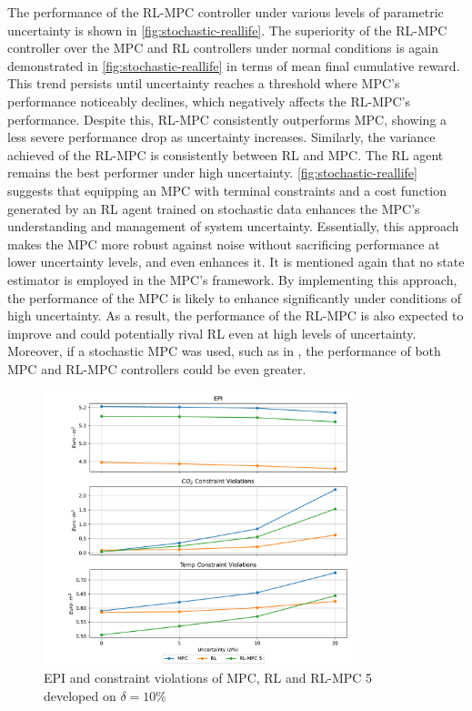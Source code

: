 The performance of the RL-MPC controller under various levels of parametric uncertainty is shown in \autoref{fig:stochastic-reallife}. The superiority of the RL-MPC controller over the MPC and RL controllers under normal conditions is again demonstrated in \autoref{fig:stochastic-reallife} in terms of mean final cumulative reward. This trend persists until uncertainty reaches a threshold where MPC's performance noticeably declines, which negatively affects the RL-MPC's performance. Despite this, RL-MPC consistently outperforms MPC, showing a less severe performance drop as uncertainty increases. Similarly, the variance achieved of the RL-MPC is consistently between RL and MPC. The RL agent remains the best performer under high uncertainty. \autoref{fig:stochastic-reallife} suggests that equipping an MPC with terminal constraints and a cost function generated by an RL agent trained on stochastic data enhances the MPC's understanding and management of system uncertainty. Essentially, this approach makes the MPC more robust against noise without sacrificing performance at lower uncertainty levels, and even enhances it. It is mentioned again that no state estimator is employed in the MPC's framework. By implementing this approach, the performance of the MPC is likely to enhance significantly under conditions of high uncertainty. As a result, the performance of the RL-MPC is also expected to improve and could potentially rival RL even at high levels of uncertainty. Moreover, if a stochastic MPC was used, such as in \citet{boersmaRobustSamplebasedModel2022}, the performance of both MPC and RL-MPC controllers could be even greater.


\begin{figure}[H]
	\centering
	\includegraphics[width=0.8\textwidth]{figures/stochastic_realife_constraints.pdf}
	\caption{EPI and constraint violations of MPC, RL and RL-MPC 5 developed on $\delta = 10\%$}
	\label{fig:stochastic-reallife-constraints}
\end{figure} 

